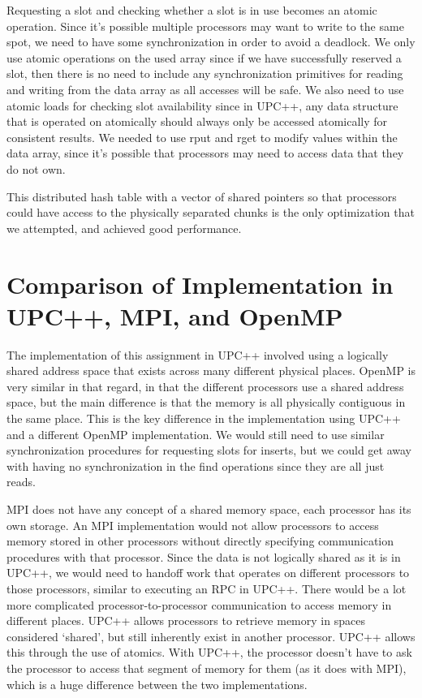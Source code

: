 \documentclass{article}
\begin{document}
Requesting a slot and checking whether a slot is in use becomes an atomic operation. Since it’s possible multiple processors may want to write to the same spot, we need to have some synchronization in order to avoid a deadlock. We only use atomic operations on the used array since if we have successfully reserved a slot, then there is no need to include any synchronization primitives for reading and writing from the data array as all accesses will be safe. We also need to use atomic loads for checking slot availability since in UPC++, any data structure that is operated on atomically should always only be accessed atomically for consistent results. We needed to use rput and rget to modify values within the data array, since it’s possible that processors may need to access data that they do not own.

This distributed hash table with a vector of shared pointers so that processors could have access to the physically separated chunks is the only optimization that we attempted, and achieved good performance. 

\section{Comparison of Implementation in UPC++, MPI, and OpenMP}

The implementation of this assignment in UPC++ involved using a logically shared address space that exists across many different physical places. OpenMP is very similar in that regard, in that the different processors use a shared address space, but the main difference is that the memory is all physically contiguous in the same place. This is the key difference in the implementation using UPC++ and a different OpenMP implementation. We would still need to use similar synchronization procedures for requesting slots for inserts, but we could get away with having no synchronization in the find operations since they are all just reads.

MPI does not have any concept of a shared memory space, each processor has its own storage. An MPI implementation would not allow processors to access memory stored in other processors without directly specifying communication procedures with that processor. Since the data is not logically shared as it is in UPC++, we would need to handoff work that operates on different processors to those processors, similar to executing an RPC in UPC++. There would be a lot more complicated processor-to-processor communication to access memory in different places. UPC++ allows processors to retrieve memory in spaces considered ‘shared’, but still inherently exist in another processor. UPC++ allows this through the use of atomics. With UPC++, the processor doesn’t have to ask the processor to access that segment of memory for them (as it does with MPI), which is a huge difference between the two implementations.
\end{document}
